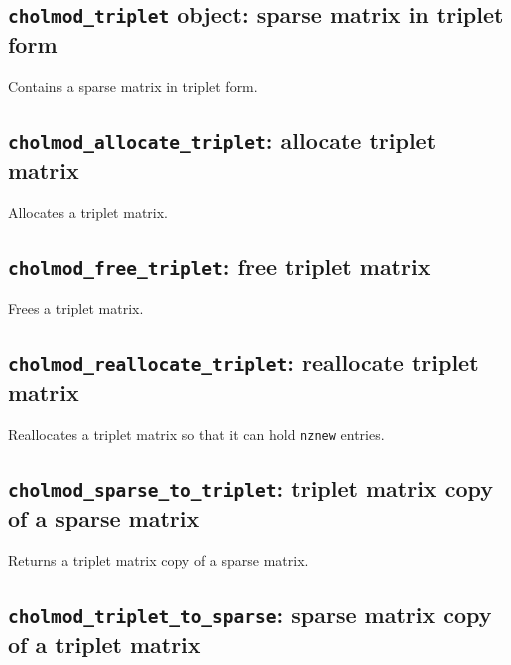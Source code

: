 \documentclass[11pt]{article}
\begin{document}
\subsection{{\tt cholmod\_triplet} object: sparse matrix in triplet form}


Contains a sparse matrix in triplet form.

\subsection{{\tt cholmod\_allocate\_triplet}: allocate triplet matrix}


Allocates a triplet matrix.

\subsection{{\tt cholmod\_free\_triplet}: free triplet matrix}


Frees a triplet matrix.

\newpage \subsection{{\tt cholmod\_reallocate\_triplet}: reallocate triplet matrix}


Reallocates a triplet matrix so that it can hold {\tt nznew} entries.

\subsection{{\tt cholmod\_sparse\_to\_triplet}: triplet matrix copy of a sparse matrix}


Returns a triplet matrix copy of a sparse matrix.

\subsection{{\tt cholmod\_triplet\_to\_sparse}: sparse matrix copy of a triplet matrix}
\end{document}
